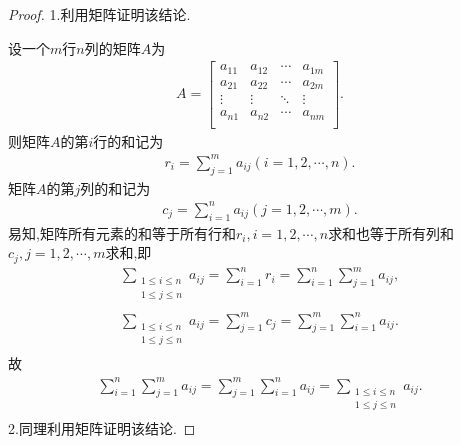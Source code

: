 \documentclass[../../main.tex]{subfiles}%
\begin{document}
\begin{proof}
1.利用矩阵证明该结论.

设一个$m$行$n$列的矩阵$A$为
\begin{align*}
A=\left[ \begin{matrix}
a_{11}&		a_{12}&		\cdots&		a_{1m}\\
a_{21}&		a_{22}&		\cdots&		a_{2m}\\
\vdots&		\vdots&		\ddots&		\vdots\\
a_{n1}&		a_{n2}&		\cdots&		a_{nm}\\
\end{matrix} \right] .
\nonumber
\end{align*}
则矩阵$A$的第$i$行的和记为
\begin{align*}
r_i=\sum\limits_{j=1}^m{a_{ij}}\left( i=1,2,\cdots ,n \right) .
\nonumber
\end{align*}
矩阵$A$的第$j$列的和记为
\begin{align*}
c_j=\sum\limits_{i=1}^n{a_{ij}}\left( j=1,2,\cdots ,m \right) .
\nonumber
\end{align*}
易知,矩阵所有元素的和等于所有行和$r_i,i=1,2,\cdots,n$求和也等于所有列和$c_j,j=1,2,\cdots,m$求和,即
\begin{align*}
\sum\limits_{\substack{1\leqslant i\leqslant n\\1\leqslant j\leqslant n\\}}a_{ij}=\sum\limits_{i=1}^n{r_i}=\sum\limits_{i=1}^n{\sum\limits_{j=1}^m{a_{ij}}},
\\
\sum\limits_{\substack{1\leqslant i\leqslant n\\1\leqslant j\leqslant n\\}}a_{ij}=\sum\limits_{j=1}^m{c_j}=\sum\limits_{j=1}^m{\sum\limits_{i=1}^n{a_{ij}}}.
\nonumber
\end{align*}
故\begin{align*}
\sum\limits_{i=1}^n{\sum\limits_{j=1}^m{a_{ij}}}=\sum\limits_{j=1}^m{\sum\limits_{i=1}^n{a_{ij}}}=\sum\limits_{\substack{1\leqslant i\leqslant n\\1\leqslant j\leqslant n\\}}a_{ij}.
\nonumber
\end{align*}
2.同理利用矩阵证明该结论.


\end{proof}
\end{document}
